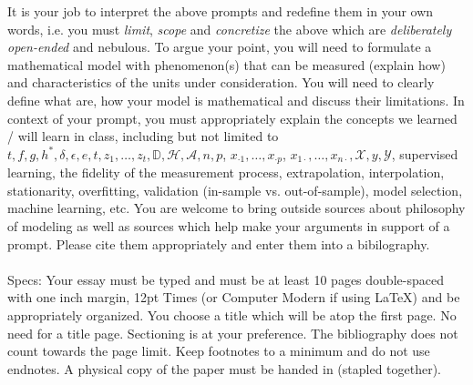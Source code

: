 \documentclass[12pt]{article}
\begin{document}
\noindent It is your job to interpret the above prompts and redefine them in your own words, i.e. you must \textit{limit}, \textit{scope} and \textit{concretize} the above which are \textit{deliberately open-ended} and nebulous. To argue your point, you will need to formulate a mathematical model with phenomenon(s) that can be measured (explain how) and characteristics of the units under consideration. You will need to clearly define what  are, how your model is mathematical and discuss their limitations. In context of your prompt, you must appropriately explain the concepts we learned / will learn in class, including but not limited to $t ,f, g, h^*, \delta, \epsilon, e, t, z_1, \ldots, z_t, \mathbb{D}, \mathcal{H}, \mathcal{A}, n, p$, $x_{\cdot 1}, \ldots, x_{\cdot p}$, $x_{1 \cdot}, \ldots, x_{n \cdot}, \mathcal{X}, y, \mathcal{Y}$, supervised learning, the fidelity of the measurement process, extrapolation, interpolation, stationarity, overfitting, validation (in-sample vs. out-of-sample), model selection, machine learning, etc. You are welcome to bring outside sources about philosophy of modeling as well as sources which help make your arguments in support of a prompt. Please cite them appropriately and enter them into a bibilography.\\
~\\
Specs: Your essay must be typed and must be at least 10 pages double-spaced with one inch margin, 12pt Times (or Computer Modern if using \LaTeX) and be appropriately organized. You choose a title which will be atop the first page. No need for a title page. Sectioning is at your preference. The bibliography does not count towards the page limit. Keep footnotes to a minimum and do not use endnotes. A physical copy of the paper must be handed in (stapled together).

\end{document}
